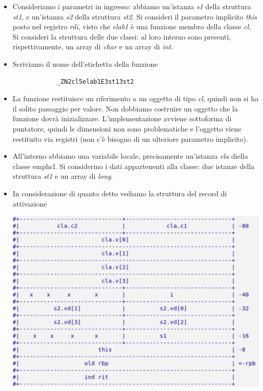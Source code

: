 	\begin{itemize}
		\item Consideriamo i parametri in ingresso: abbiamo un'istanza \emph{s1} della struttura \emph{st1}, e un'istanza \emph{s2} della struttura \emph{st2}. Si consideri il parametro implicito \emph{this} posto nel registro \emph{rdi}, visto che \emph{elab1} è una funzione membro della classe \emph{cl}. Si consideri la struttura delle due classi: al loro interno sono presenti, rispettivamente, un array di \emph{char} e un array di \emph{int}.
		\item Scriviamo il nome dell'etichetta della funzione
		\begin{verbatim}
			_ZN2cl5elab1E3st13st2
		\end{verbatim}
		\item La funzione restituisce un riferimento a un oggetto di tipo \emph{cl}, quindi non si ha il solito passaggio per valore. Non dobbiamo costruire un oggetto che la funzione dovrà inizializzare. L'implementazione avviene sottoforma di puntatore, quindi le dimensioni non sono problematiche e l'oggetto viene restituito via registri (non c'è bisogno di un ulteriore parametro implicito).
		\item All'interno abbiamo una variabile locale, precisamente un'istanza \emph{cla} diella classe emph{cl}. Si considerino i dati appartenenti alla classe: due istanze della struttura \emph{st1} e un array di \emph{long}.
		\item In considerazione di quanto detto vediamo la struttura del record di attivazione
		\begin{center}
			\includegraphics{img/49.PNG}
		\end{center}  

\end{itemize}
